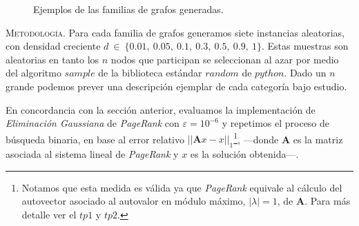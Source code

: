 \begin{figure}[!htbp]
    \vspace{1em}
    \caption{Ejemplos de las familias de grafos generadas.} %
    \label{familias}
\end{figure}



\noindent\textsc{Metodología}. Para cada familia de grafos generamos siete instancias aleatorias, con densidad creciente $d\ \in\ \{0.01,\ 0.05,\ 0.1,\ 0.3,\ 0.5,\ 0.9,\ 1\}$.
Estas muestras son aleatorias en tanto los $n$ nodos que participan se seleccionan al azar por medio del algoritmo $sample$ de la biblioteca estándar $random$ de $python$.
Dado un $n$ grande podemos prever una descripción ejemplar de cada categoría bajo estudio. 

En concordancia con la sección anterior, evaluamos la implementación de \textit{Eliminación Gaussiana} de \textit{PageRank} con $\varepsilon = 10^{-6}$ y repetimos el proceso de búsqueda binaria, en base al error relativo $||\mathbf{A}x - x||_1$\footnote{Notamos que esta medida es válida ya que \textit{PageRank} equivale al cálculo del autovector asociado al autovalor en módulo máximo, $|\lambda| = 1$, de \textbf{A}. Para más detalle ver el $tp1$ y $tp2$.}, ---donde \textbf{A} es la matriz asociada al sistema lineal de \textit{PageRank} y $x$ es la solución obtenida---. %

